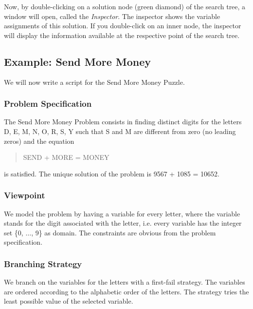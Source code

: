 \documentclass[a4paper,halfparskip]{scrartcl}
\begin{document}
Now, by double-clicking on a solution node 
(green diamond) of the search tree, a window
will open, called the \emph{Inspector}. The 
inspector shows the variable assignments of
this solution.
If you double-click on an inner node, the 
inspector will display the information available 
at the respective point of the search tree.

\subsection{Example: Send More Money}
We will now write a script for the Send More 
Money Puzzle.

\subsubsection{Problem Specification}
The Send More Money Problem consists in finding 
distinct digits for the letters 
D, E, M, N, O, R, S, Y such that S and M are 
different from zero (no leading zeros) 
and the equation
\begin{quote}
SEND + MORE = MONEY
\end{quote}
is satisfied. The unique solution of the problem 
is 9567 + 1085 = 10652.

\subsubsection{Viewpoint}
We model the problem by having a variable for 
every letter, where the variable 
stands for the digit associated with the letter,
i.e. every variable has the integer set 
\{0, $\ldots$, 9\} as domain.
 The constraints are obvious 
from the problem specification.

\subsubsection{Branching Strategy}
\label{distribstrat}
We branch on the variables for the letters 
with a first-fail strategy.
The variables are ordered according to the 
alphabetic order of the letters. 
The strategy tries the least possible value 
of the selected variable. 
\end{document}
